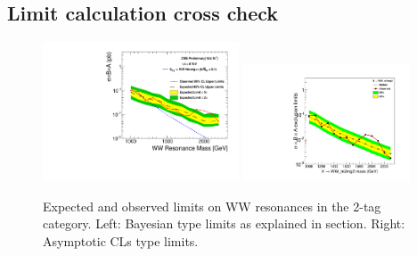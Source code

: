 \clearpage

\subsection{Limit calculation cross check}

\begin{figure}[htb]
\begin{center}
\includegraphics[width=0.52\textwidth,angle=0]{figs/appendix/RSGWWherwig_2Tag_limit_obsexp.pdf}
\includegraphics[width=0.44\textwidth,angle=0]{figs/appendix/brazilianFlag_acc_WW_m2mg2.pdf}
\end{center}
\caption{Expected and observed limits on WW resonances in the 2-tag category.
Left: Bayesian type limits as explained in section. Right: Asymptotic CLs type limits.}
\label{fig:app}
\end{figure}
